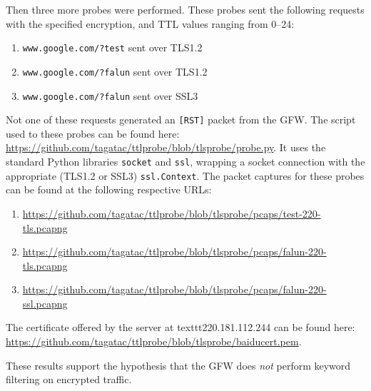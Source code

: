 Then three more probes were performed.
These probes sent the following requests with the specified encryption, and TTL values ranging from 0--24:
\begin{enumerate}\addtolength{\itemsep}{-.35\baselineskip}
	\item \texttt{www.google.com/?test} sent over TLS1.2
	\item \texttt{www.google.com/?falun} sent over TLS1.2
	\item \texttt{www.google.com/?falun} sent over SSL3
\end{enumerate}
Not one of these requests generated an \texttt{[RST]} packet from the GFW.
The script used to these probes can be found here: \url{https://github.com/tagatac/ttlprobe/blob/tlsprobe/probe.py}.
It uses the standard Python libraries \texttt{socket} and \texttt{ssl}, wrapping a socket connection with the appropriate (TLS1.2 or SSL3) \texttt{ssl.Context}.
The packet captures for these probes can be found at the following respective URLs:
\begin{enumerate}\addtolength{\itemsep}{-.35\baselineskip}
	\item \url{https://github.com/tagatac/ttlprobe/blob/tlsprobe/pcaps/test-220-tls.pcapng}
	\item \url{https://github.com/tagatac/ttlprobe/blob/tlsprobe/pcaps/falun-220-tls.pcapng}
	\item \url{https://github.com/tagatac/ttlprobe/blob/tlsprobe/pcaps/falun-220-ssl.pcapng}
\end{enumerate}
The certificate offered by the server at texttt{220.181.112.244} can be found here: \url{https://github.com/tagatac/ttlprobe/blob/tlsprobe/baiducert.pem}.

These results support the hypothesis that the GFW does \textit{not} perform keyword filtering on encrypted traffic.